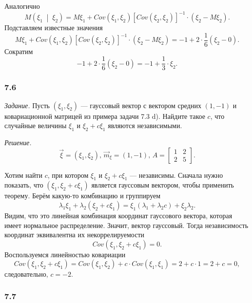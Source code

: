 \begin{enumerate}[label=\alph*)]
  Аналогично
  $$M \left( \xi_1 \; \middle| \; \xi_2 \right) =
    M \xi_1 +
    Cov \left( \xi_1, \xi_2 \right) \left[ Cov \left( \xi_2, \xi_2 \right) \right]^{-1} \cdot
    \left( \xi_2 - M \xi_2 \right).$$
  Подставляем известные значения
  $$M \xi_1 +
    Cov \left( \xi_1, \xi_2 \right) \left[ Cov \left( \xi_2, \xi_2 \right) \right]^{-1} \cdot
    \left( \xi_2 - M \xi_2 \right) =
    -1 + 2 \cdot \frac{1}{6} \left( \xi_2 - 0 \right).$$
  Сократим
  $$-1 + 2 \cdot \frac{1}{6} \left( \xi_2 - 0 \right) =
    -1 + \frac{1}{3} \cdot \xi_2.$$
\end{enumerate}

\subsubsection*{7.6}

\textit{Задание.}
Пусть $ \left( \xi_1, \xi_2 \right) $ ---
гауссовый вектор с вектором средних $ \left( 1, -1 \right) $
и ковариационной матрицей из примера задачи 7.3 d).
Найдите такое $c$, что случайные величины $ \xi_1$ и $ \xi_2 + c \xi_1$ являются независимыми.

\textit{Решение.}
$$ \vec{ \xi } = \left( \xi_1, \xi_2 \right), \,
  \vec{m}_{ \xi } = \left(1, -1 \right), \,
  A =
  \begin{bmatrix}
    1 & 2 \\
    2 & 5
  \end{bmatrix}.$$

Хотим найти $c$, при котором $ \xi_1$ и $ \xi_2 + c \xi_1$ --- независимы.
Сначала нужно показать, что $ \left( \xi_1, \xi_2 + c \xi_1 \right) $ является гауссовым вектором,
чтобы применить теорему.
Берём какую-то комбинацию и группируем
$$ \lambda_1 \xi_1 + \lambda_2 \left( \xi_2 + c \xi_1 \right) =
  \xi_1 \left( \lambda_1 + \lambda_2 c \right) + \xi_2 \lambda_2.$$
Видим, что это линейная комбинация координат гауссового вектора,
которая имеет нормальное распределение.
Значит, вектор гауссовый.
Тогда независимость координат эквивалентна их некоррелируемости
$$Cov \left( \xi_1, \xi_2 + c \xi_1 \right) =
  0.$$
Воспользуемся линейностью ковариации
$$Cov \left( \xi_1, \xi_2 + c \xi_1 \right) =
  Cov \left( \xi_1, \xi_2 \right) + c \cdot Cov \left( \xi_1, \xi_1 \right) =
  2 + c \cdot 1 =
  2 + c =
  0,$$
следовательно, $c = -2$.

\subsubsection{7.7}

